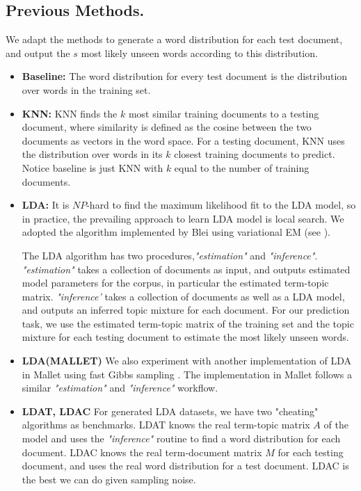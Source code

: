 \subsection{Previous Methods.}

We adapt the methods to generate a  word distribution for each test document, and output the $s$ most likely unseen words according to this distribution.

\begin{itemize}

\item
{\bf Baseline:} The word distribution for every test document is the distribution over words in the training set. 

\item
{\bf KNN:} KNN finds the $k$ most similar training documents to a
testing document, where similarity is defined as the cosine between
the two documents as vectors in the word space. For a testing
document, KNN uses the distribution over words in
its $k$ closest training documents to predict. Notice baseline is just KNN with
$k$ equal to the number of training documents.


\item
{\bf LDA:} It is $NP$-hard to find the maximum likelihood fit to the LDA model,
so in practice, the prevailing approach to learn LDA model is local
search. We adopted the algorithm implemented by Blei \cite{LDAcode}
using variational EM (see \cite{Blei2003a}).

The LDA algorithm has two procedures,{\em "estimation"} and {\em "inference"}. {\em "estimation"} takes a collection of documents as
input, and outputs estimated model parameters for the corpus, in
particular the estimated term-topic matrix. {\em "inference'} takes a
collection of documents as well as a LDA model, and outputs an
inferred topic mixture for each document. For our prediction task, we
use the estimated term-topic matrix of the training set and the topic
mixture for each testing document to estimate the most likely unseen
words.

\item
{\bf LDA(MALLET)} We also experiment with another implementation of LDA in Mallet \cite{McCallumMALLET} using fast Gibbs sampling \cite{MimnoSparse}. The implementation in Mallet follows a similar {\em "estimation"} and {\em "inference"} workflow.


\item {\bf LDAT, LDAC} For generated LDA datasets, we have two
  "cheating" algorithms as benchmarks. LDAT knows the real term-topic
  matrix $A$ of the model and uses the {\em "inference"} routine to find a
  word distribution for each document.  LDAC knows the real
  term-document matrix $M$ for each testing document, and uses the
  real word distribution for a test document.  LDAC is the best we can
  do given sampling noise.


\end{itemize}
